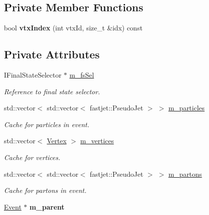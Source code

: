 \subsection*{Private Member Functions}
\begin{CompactItemize}
\item 
\hypertarget{classEvent_85cd9f4de17dc94fb34df30020d3046e}{
bool \textbf{vtx\-Index} (int vtx\-Id, size\_\-t \&idx) const }
\label{classEvent_85cd9f4de17dc94fb34df30020d3046e}

\end{CompactItemize}
\subsection*{Private Attributes}
\begin{CompactItemize}
\item 
\hypertarget{classEvent_51f6cb17b388bf6bd2dec4a8dba654a0}{
IFinal\-State\-Selector $\ast$ \hyperlink{classEvent_51f6cb17b388bf6bd2dec4a8dba654a0}{m\_\-fs\-Sel}}
\label{classEvent_51f6cb17b388bf6bd2dec4a8dba654a0}

\begin{CompactList}\small\item\em Reference to final state selector. \item\end{CompactList}\item 
std::vector$<$ std::vector$<$ fastjet::Pseudo\-Jet $>$ $>$ \hyperlink{classEvent_9d70f2f173bbb01fbd90e15860697a18}{m\_\-particles}
\begin{CompactList}\small\item\em Cache for particles in event. \item\end{CompactList}\item 
std::vector$<$ \hyperlink{classVertex}{Vertex} $>$ \hyperlink{classEvent_9698c3f6d91d9571686295626049ac9c}{m\_\-vertices}
\begin{CompactList}\small\item\em Cache for vertices. \item\end{CompactList}\item 
std::vector$<$ std::vector$<$ fastjet::Pseudo\-Jet $>$ $>$ \hyperlink{classEvent_154cfb0e8a14e418e1eae7ccdf99245d}{m\_\-partons}
\begin{CompactList}\small\item\em Cache for partons in event. \item\end{CompactList}\item 
\hypertarget{classEvent_dad4b1de65fd86908385a53b37d35d43}{
\hyperlink{classEvent}{Event} $\ast$ \textbf{m\_\-parent}}
\label{classEvent_dad4b1de65fd86908385a53b37d35d43}

\end{CompactItemize}
